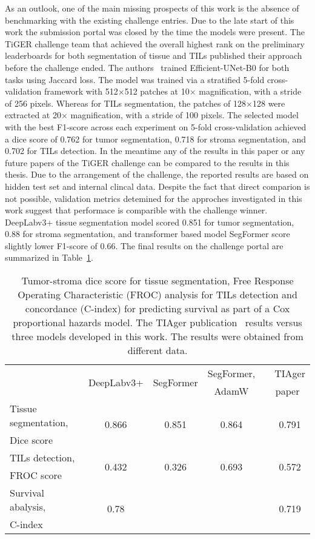 As an outlook, one of the main missing prospects of this work is the absence of
benchmarking with the existing challenge entries. Due to the late start of this
work the submission portal was closed by the time the models were present. 
The TiGER challenge team that achieved the overall highest rank on the preliminary leaderboards
for both segmentation of tissue and TILs published their approach before the challenge ended.
The authors~\cite{shephard2022tiager} trained Efficient-UNet-B0 for both tasks using Jaccard loss.
The model was trained via a stratified 5-fold
cross-validation framework with 512$\times$512 patches at 10$\times$ magnification,
with a stride of 256 pixels. Whereas for TILs segmentation,
the patches of 128$\times$128 were extracted at 20$\times$ magnification, with a stride of 100 pixels.
The selected model with the best F1-score across each experiment on 5-fold cross-validation achieved
a dice score of 0.762 for tumor segmentation, 0.718 for stroma segmentation, and 0.702 for TILs
detection. In the meantime any of the results in this paper or any future papers
of the TiGER challenge can be compared to the results in this thesis. Due to the arrangement of the
challenge, the reported results are based on hidden test set and internal clincal data.
Despite the fact that direct comparion is not possible, validation metrics detemined for the
approches investigated in this work suggest that performace is comparible with the challenge winner.
DeepLabv3+ tissue segmentation model scored
0.851 for tumor segmentation, 0.88 for stroma segmentation, and transformer based model SegFormer
score slightly lower F1-score of 0.66. The final results on the challenge portal are summarized in
Table~\ref{tab:compare_paper}.
\begin{table}[h!]
    \centering
    \begin{tabular}{ l c c c c c }
        \hline
         & \multirow{2}{*}{DeepLabv3+} & \multirow{2}{*}{SegFormer} & SegFormer, & & TIAger\\
         &  &  & AdamW & & paper~\cite{shephard2022tiager}\\
        \hline
        Tissue segmentation, & \multirow{2}{*}{0.866} & \multirow{2}{*}{0.851} & \multirow{2}{*}{0.864} & & \multirow{2}{*}{0.791} \\
        Dice score &  &  &  & &  \\
        TILs detection, & \multirow{2}{*}{0.432} & \multirow{2}{*}{0.326} & \multirow{2}{*}{0.693} & & \multirow{2}{*}{0.572}\\
        FROC score &  &  &  & &  \\
        Survival abalysis, & \multirow{2}{*}{0.78} &  & & & \multirow{2}{*}{0.719}\\
        C-index &  &  &  & &  \\
        \hline
    \end{tabular}
\caption{\label{tab:compare_paper} Tumor-stroma dice score for tissue segmentation,
Free Response Operating Characteristic (FROC)
analysis for TILs detection and concordance (C-index) for predicting survival as part
of a Cox proportional hazards model. The TIAger publication~\cite{shephard2022tiager} results versus three
models developed in this work. The results were obtained from different data.}
\end{table}
